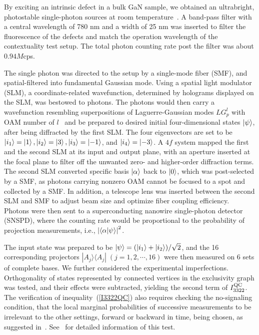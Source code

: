 \documentclass[prl,letterpaper,english,reprint,nofootinbib,aps,superscriptaddress,showpacs,showkeys]{revtex4-1}
\theoremstyle{definition}
\theoremstyle{remark}
\begin{document}
 By exciting an intrinsic defect in a bulk GaN sample, we obtained an ultrabright, photostable single-photon sources at room temperature~\cite{qli18}.
 A band-pass filter with a central wavelength of 780 nm and a width of 25 nm was inserted to filter the fluorescence of the defects and match the operation wavelength of the contextuality test setup. The total photon counting rate post the filter was about $0.94M$cps.

 The single photon was directed to the setup by a single-mode fiber (SMF), and spatial-filtered into fundamental Gaussian mode.
 Using a spatial light modulator (SLM), a coordinate-related wavefunction, determined by holograms displayed on the SLM, was bestowed to photons.
 The photons would then carry a wavefunction resembling superpositions of Laguerre-Gaussian modes $LG_p^l$ with OAM number of $l$~\cite{allen92} and be prepared to desired initial four-dimensional states $\ket{\psi}$, after being diffracted by the first SLM. The four eigenvectors are set to be $\ket{i_1} = \ket{1}, \ket{i_2} = \ket{3}, \ket{i_3} = \ket{-1}$, and $\ket{i_4} = \ket{-3}$.
 A $4f$ system mapped the first and the second SLM at its input and output plane, with an aperture inserted at the focal plane to filter off the unwanted zero- and higher-order diffraction terms.
 The second SLM converted specific basis $\ket{\alpha}$ back to $\ket{0}$, which was post-selected by a SMF, as photons carrying nonzero OAM cannot be focused to a spot and collected by a SMF.
 In addition, a telescope lens was inserted between the second SLM and SMF to adjust beam size and optimize fiber coupling efficiency.
 Photons were then sent to a superconducting nanowire single-photon detector (SNSPD), where the counting rate would be proportional to the probability of projection measurements, i.e., $\left|\braket{\alpha|\psi}\right|^2$.

 The input state was prepared to be $\ket{\psi} = (\ket{i_1}+\ket{i_2})/\sqrt{2}$, and the 16 corresponding projectors $|A_j\rangle\langle A_j|\;(j=1,2,\cdots,16)$ were then measured on 6 sets of complete bases.
 We further considered the experimental imperfections. Orthogonality of states represented by connected vertices in the exclusivity graph was tested, and their effects were subtracted, yielding the second term of $I_{3322}^{\rm QC}$.
 The verification of inequality~(\ref{I3322QC}) also requires checking the no-signaling condition, that the local marginal probabilities of successive measurements to be irrelevant to the other settings, forward or backward in time, being chosen, as suggested in~\cite{cabello16}. See~\cite{SM} for detailed information of this test.
\end{document}
